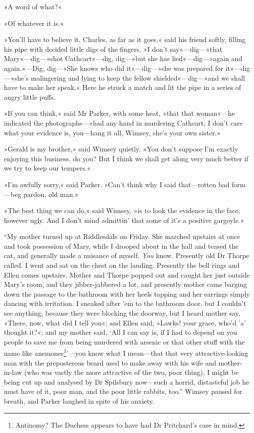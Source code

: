 »A word of what?«

»Of whatever it is.«

»You'll have to believe it, Charles, as far as it goes,« said his friend softly, filling his pipe with decided little digs of the fingers. »I don't say«—dig—»that Mary«—dig—»shot Cathcart«—dig, dig—»but she has lied«—dig—»again and again.«—Dig, dig—»She knows who did it«—dig—»she was prepared for it«—dig—»she's malingering and lying to keep the fellow shielded«—dig—»and we shall have to make her speak.« Here he struck a match and lit the pipe in a series of angry little puffs.

»If you can think,« said Mr Parker, with some heat, »that that woman«—he indicated the photographs—»had any hand in murdering Cathcart, I don't care what your evidence is, you—hang it all, Wimsey, she's your own sister.«

»Gerald is my brother,« said Wimsey quietly. »You don't suppose I'm exactly enjoying this business, do you? But I think we shall get along very much better if we try to keep our tempers.«

»I'm awfully sorry,« said Parker. »Can't think why I said that—rotten bad form—beg pardon, old man.«

»The best thing we can do,« said Wimsey, »is to look the evidence in the face, however ugly. And I don't mind admittin' that some of it's a positive gargoyle.«

\enquote{My mother turned up at Riddlesdale on Friday. She marched upstairs at once and took possession of Mary, while I drooped about in the hall and teased the cat, and generally made a nuisance of myself. \textit{You} know. Presently old Dr Thorpe called. I went and sat on the chest on the landing. Presently the bell rings and Ellen comes upstairs. Mother and Thorpe popped out and caught her just outside Mary's room, and they jibber-jabbered a lot, and presently mother came barging down the passage to the bathroom with her heels tapping and her earrings simply dancing with irritation. I sneaked after 'em to the bathroom door, but I couldn't see anything, because they were blocking the doorway, but I heard mother say, »There, now, what did I tell you«; and Ellen said, »Lawks! your grace, who'd 'a' thought it?«; and my mother said, \enquote{All I can say is, if I had to depend on you people to save me from being murdered with arsenic or that other stuff with the name like anemones\footnote{Antinomy? The Duchess appears to have had Dr Pritchard's case in mind.}}—you know what I mean—that that very attractive-looking man with the preposterous beard used to make away with his wife and mother-in-law (who was vastly the more attractive of the two, poor thing), I might be being cut up and analysed by Dr Spilsbury now—such a horrid, distasteful job he must have of it, poor man, and the poor little rabbits, too.} Wimsey paused for breath, and Parker laughed in spite of his anxiety.

